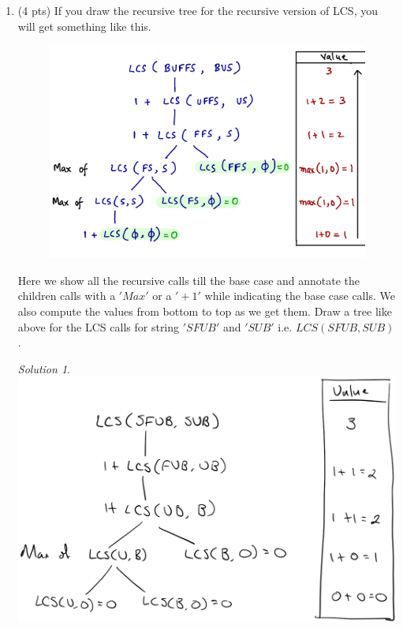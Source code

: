 \documentclass[12pt]{article}
\theoremstyle{remark}
\newtheorem*{solution}{Solution}
\begin{document}
\begin{enumerate}
\begin{enumerate}
    
    \pagebreak
    \item (4 pts) If you draw the recursive tree for the recursive version of LCS, you will get something like this.
\begin{figure}[h!]
\begin{center}
\includegraphics[scale=0.3]{LCS_recursive.jpeg} 
\end{center}
\end{figure}
Here we show all the recursive calls till the base case and annotate the children calls with a $'Max'$ or a $'+1'$ while indicating the base case calls. 
We also compute the values from bottom to top as we get them. 
Draw a tree like above for the LCS calls for string $'SFUB'$ and $'SUB'$ i.e. $LCS( SFUB, SUB ) $.

\begin{solution}
\includegraphics[scale=0.5]{PS9b-Q4b.png} 
\end{solution}

\end{enumerate}
    
    
\end{enumerate}
\end{document}
